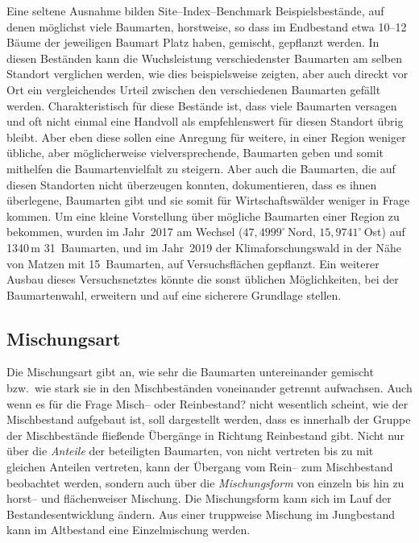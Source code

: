 \documentclass[twocolumn]{scrartcl}
\begin{document}
Eine seltene Ausnahme bilden Site--Index--Benchmark Beispielsbestände,
auf denen möglichst viele Baumarten, horstweise, so dass im Endbestand
etwa 10--12 Bäume der jeweiligen Baumart Platz haben, gemischt,
gepflanzt werden. In diesen Beständen kann die Wuchsleistung
verschiedenster Baumarten am selben Standort verglichen werden, wie
dies beispielsweise \cite{mayer1970anbauversuch} zeigten, aber auch
direckt vor Ort ein vergleichendes Urteil zwischen den verschiedenen
Baumarten gefällt werden. Charakteristisch für diese Bestände ist,
dass viele Baumarten versagen und oft nicht einmal eine Handvoll als
empfehlenswert für diesen Standort übrig bleibt. Aber eben diese
sollen eine Anregung für weitere, in einer Region weniger übliche,
aber möglicherweise vielversprechende, Baumarten geben und somit
mithelfen die Baumartenvielfalt zu steigern. Aber auch die Baumarten,
die auf diesen Standorten nicht überzeugen konnten, dokumentieren,
dass es ihnen überlegene, Baumarten gibt und sie somit für
Wirtschaftswälder weniger in Frage kommen. Um eine kleine Vorstellung
über mögliche Baumarten einer Region zu bekommen, wurden im Jahr~2017
am Wechsel ($47,4999^{\circ}$\,Nord, $15,9741^{\circ}$\,Ost) auf
1340\,m 31~Baumarten, und im Jahr~2019 der Klimaforschungswald in der
Nähe von Matzen mit 15~Baumarten, auf Versuchsflächen gepflanzt. Ein
weiterer Ausbau dieses Versuchsnetztes könnte die sonst üblichen
Möglichkeiten, bei der Baumartenwahl, erweitern und auf eine sicherere
Grundlage stellen.

\subsection{Mischungsart}
\label{ssec:mischugnsart}

Die Mischungsart gibt an, wie sehr die Baumarten untereinander
gemischt bzw.\ wie stark sie in den Mischbeständen voneinander
getrennt aufwachsen. Auch wenn es für die Frage \glqq Misch-- oder
Reinbestand?\grqq{} nicht wesentlich scheint, wie der Mischbestand
aufgebaut ist, soll dargestellt werden, dass es innerhalb der Gruppe
der Mischbestände fließende Übergänge in Richtung Reinbestand
gibt. Nicht nur über die \emph{Anteile} der beteiligten Baumarten, von
\glqq nicht vertreten\grqq{} bis zu \glqq mit gleichen Anteilen
vertreten\grqq{}, kann der Übergang vom Rein-- zum Mischbestand
beobachtet werden, sondern auch über die \emph{Mischungsform} von
einzeln bis hin zu horst-- und flächenweiser Mischung. Die
Mischungsform kann sich im Lauf der Bestandesentwicklung ändern. Aus
einer truppweise Mischung im Jungbestand kann im Altbestand eine
Einzelmischung werden.
\end{document}
